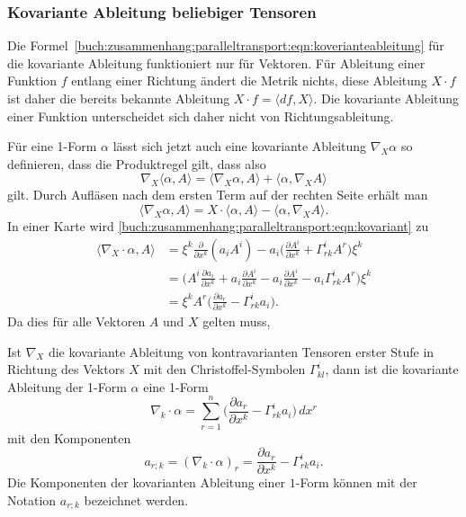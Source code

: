 %
%
\subsubsection{Kovariante Ableitung beliebiger Tensoren}
Die Formel~\eqref{buch:zusammenhang:paralleltransport:eqn:koverianteableitung}
für die kovariante Ableitung funktioniert nur für Vektoren.
Für Ableitung einer Funktion $f$ entlang einer Richtung ändert
die Metrik nichts, diese Ableitung $X\cdot f$ ist daher die bereits
bekannte Ableitung $X\cdot f = \langle df,X\rangle$.
Die kovariante Ableitung einer Funktion unterscheidet sich daher nicht
von Richtungsableitung.

Für eine 1-Form $\alpha$ lässt sich jetzt auch eine kovariante Ableitung
$\nabla_X\alpha$ so definieren, dass die Produktregel gilt, dass also
\[
\nabla_X
\langle \alpha, A\rangle
=
\langle \nabla_X\alpha,A\rangle
+
\langle \alpha,\nabla_X A\rangle
\]
gilt.
Durch Aufläsen nach dem ersten Term auf der rechten Seite erhält man
\begin{equation}
\langle \nabla_X\alpha,A\rangle
=
X
\cdot
\langle \alpha, A\rangle
-
\langle \alpha,\nabla_X A\rangle.
\label{buch:zusammenhang:paralleltransport:eqn:kovariant}
\end{equation}
In einer Karte wird 
\eqref{buch:zusammenhang:paralleltransport:eqn:kovariant}
zu
\begin{align*}
\langle
\nabla_X\cdot\alpha, A
\rangle
&=
\xi^k
\frac{\partial}{\partial x^k} (a_i A^i)
-
a_i
\biggl(
\frac{\partial A^i}{\partial x^k}
+
\Gamma^i_{rk} A^r
\biggr)
\xi^k
\\
&=
\biggl(
A^i
\frac{\partial a_i}{\partial x^k}
+
a_i
\frac{\partial A^i}{\partial x^k}
-
a_i
\frac{\partial A^i}{\partial x^k}
-
a_i
\Gamma^i_{rk} A^r
\biggr)
\xi^k
\\
&=
\xi^k A^r
\biggl(
\frac{\partial a_r}{\partial x^k}
-
\Gamma^i_{rk}a_i
\biggr).
\end{align*}
Da dies für alle Vektoren $A$ und $X$ gelten muss, 

\begin{definition}
\label{buch:zusammenhang:parallel:definition:kovabl1form}
Ist $\nabla_X$ die kovariante Ableitung von kontravarianten
Tensoren erster Stufe in Richtung des Vektors $X$ mit den
Christoffel-Symbolen $\Gamma^i_{kl}$,
dann ist die kovariante Ableitung
der 1-Form $\alpha$ eine 1-Form
\[
\nabla_k\cdot\alpha
=
\sum_{r=1}^n
\biggl(
\frac{\partial a_r}{\partial x^k} - \Gamma^i_{rk}a_i
\biggr)
\,dx^r
\]
mit den Komponenten
\[
a_{r;k}
=
(\nabla_k\cdot\alpha)_r
=
\frac{\partial a_r}{\partial x^k} - \Gamma^i_{rk}a_i.
\]
Die Komponenten der kovarianten Ableitung einer $1$-Form
können mit der Notation $a_{r;k}$ bezeichnet werden.
\end{definition}

